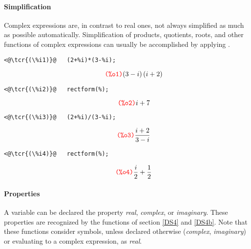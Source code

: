 \documentclass[../Maxima_Workbook.tex]{subfiles}
\begin{document}
\paragraph{Simplification} \mbox{}

\lz Complex expressions are, in contrast to real ones, not always simplified as much as possible automatically. Simplification of products, quotients, roots, and other functions of complex expressions can usually be accomplished by applying .

\vspace{1mm}\begin{small}
\color{blue} \leqn
\begin{lstlisting}
<@\tcr{(\%i1)}@   (2+%i)*(3-%i);
\end{lstlisting}
\vspace{-6mm} \[\tag*{\tcr{\ttfamily (\%o1)}} (3-i) \, (i+2) \]
\vspace{-9mm} 
\begin{lstlisting}
<@\tcr{(\%i2)}@   rectform(%);
\end{lstlisting}
\vspace{-6mm} \[\tag*{\tcr{\ttfamily (\%o2)}} i+7 \]
\vspace{-9mm} 
\begin{lstlisting}
<@\tcr{(\%i3)}@   (2+%i)/(3-%i);
\end{lstlisting}
\vspace{-6mm} \[\tag*{\tcr{\ttfamily (\%o3)}} \frac{i+2}{3-i} \]
\vspace{-8mm} 
\begin{lstlisting}
<@\tcr{(\%i4)}@   rectform(%);
\end{lstlisting}
\vspace{-6mm} \[\tag*{\tcr{\ttfamily (\%o4)}} \frac{i}{2}+\frac{1}{2} \]
\color{black} \reqn
\end{small} \vspace{-2mm} 

\paragraph{Properties} \mbox{}\label{DS4a}

\lz A variable can be declared the property \emph{real}, \emph{complex}, or \emph{imaginary}. These properties are recognized by the functions of section \ref{DS4} and \ref{DS4b}. Note that these functions consider symbols, unless declared otherwise (\emph{complex}, \emph{imaginary}) or evaluating to a complex expression, as \emph{real}.
\end{document}
